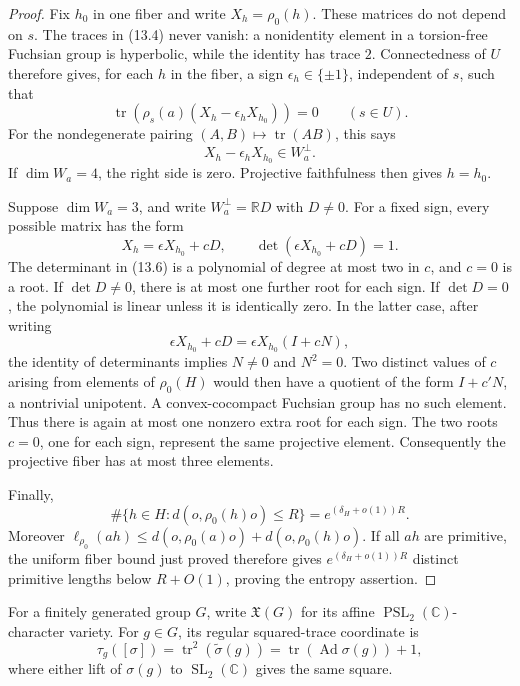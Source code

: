 \documentclass[11pt,reqno]{amsart}
\theoremstyle{definition}
\theoremstyle{remark}
\newcommand{\R}{\mathbb R}
\newcommand{\C}{\mathbb C}
\newcommand{\Tr}{\operatorname{tr}}
\newcommand{\SL}{\operatorname{SL}}
\newcommand{\PSL}{\operatorname{PSL}}
\newcommand{\Ad}{\operatorname{Ad}}
\begin{document}
\begin{proof}
Fix \(h_0\) in one fiber and write \(X_h=\rho_0(h)\).  These matrices do
not depend on \(s\).  The traces in (13.4) never vanish: a nonidentity
element in a torsion-free Fuchsian group is hyperbolic, while the identity
has trace \(2\).  Connectedness of \(U\) therefore gives, for each \(h\) in
the fiber, a sign \(\epsilon_h\in\{\pm1\}\), independent of \(s\), such
that
\[
 \Tr\!\left(\rho_s(a)(X_h-\epsilon_hX_{h_0})\right)=0
 \qquad(s\in U).
\]
For the nondegenerate pairing \((A,B)\mapsto\Tr(AB)\), this says
\[
 X_h-\epsilon_hX_{h_0}\in W_a^\perp.
\tag{13.5}
\]
If \(\dim W_a=4\), the right side is zero.  Projective faithfulness then
gives \(h=h_0\).

Suppose \(\dim W_a=3\), and write \(W_a^\perp=\R D\) with \(D\ne0\).
For a fixed sign, every possible matrix has the form
\[
 X_h=\epsilon X_{h_0}+cD,\qquad
 \det(\epsilon X_{h_0}+cD)=1.
\tag{13.6}
\]
The determinant in (13.6) is a polynomial of degree at most two in \(c\),
and \(c=0\) is a root.  If \(\det D\ne0\), there is at most one further
root for each sign.  If \(\det D=0\), the polynomial is linear unless it is
identically zero.  In the latter case, after writing
\[
 \epsilon X_{h_0}+cD
 =\epsilon X_{h_0}(I+cN),
\]
the identity of determinants implies \(N\ne0\) and \(N^2=0\).  Two distinct values
of \(c\) arising from elements of \(\rho_0(H)\) would then have a quotient
of the form \(I+c'N\), a nontrivial unipotent.  A convex-cocompact
Fuchsian group has no such element.  Thus there is again at most one
nonzero extra root for each sign.  The two roots \(c=0\), one for each
sign, represent the same projective element.  Consequently the projective
fiber has at most three elements.

Finally,
\[
 \#\{h\in H:d(o,\rho_0(h)o)\le R\}
   =e^{(\delta_H+o(1))R}.
\]
Moreover
\(\ell_{\rho_0}(ah)\le d(o,\rho_0(a)o)+d(o,\rho_0(h)o)\).
If all \(ah\) are primitive, the uniform fiber bound just proved therefore
gives \(e^{(\delta_H+o(1))R}\) distinct primitive lengths below
\(R+O(1)\), proving the entropy assertion.
\end{proof}

For a finitely generated group \(G\), write \(\mathfrak X(G)\) for its affine
\(\PSL_2(\C)\)-character variety.  For \(g\in G\), its regular squared-trace
coordinate is
\[
 \tau_g([\sigma])=\Tr^2(\widetilde\sigma(g))
                 =\Tr(\Ad\sigma(g))+1,
\]
where either lift of \(\sigma(g)\) to \(\SL_2(\C)\) gives the same square.
\end{document}
